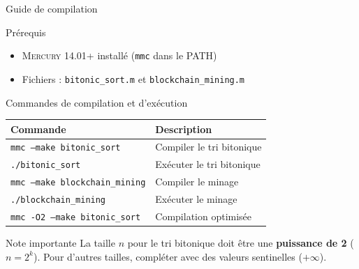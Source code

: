 \documentclass[aspectratio=169,12pt]{beamer}
\newcommand{\mercury}{\textsc{Mercury}}
\begin{document}
\begin{frame}{\faTerminal\quad Guide de compilation}
  \begin{block}{Prérequis}
    \begin{itemize}
      \item \mercury{} 14.01+ installé (\texttt{mmc} dans le PATH)
      \item Fichiers : \texttt{bitonic\_sort.m} et
            \texttt{blockchain\_mining.m}
    \end{itemize}
  \end{block}

  \vspace{0.4em}
  \begin{exampleblock}{Commandes de compilation et d'exécution}
    \begin{tabular}{ll}
      \toprule
      \textbf{Commande} & \textbf{Description} \\
      \midrule
      \texttt{mmc --make bitonic\_sort} &
        Compiler le tri bitonique \\
      \texttt{./bitonic\_sort} &
        Exécuter le tri bitonique \\
      \texttt{mmc --make blockchain\_mining} &
        Compiler le minage \\
      \texttt{./blockchain\_mining} &
        Exécuter le minage \\
      \texttt{mmc -O2 --make bitonic\_sort} &
        Compilation optimisée \\
      \bottomrule
    \end{tabular}
  \end{exampleblock}

  \vspace{0.3em}
  \begin{alertblock}{Note importante}
    La taille $n$ pour le tri bitonique doit être une
    \textbf{puissance de 2} ($n = 2^k$). Pour d'autres tailles,
    compléter avec des valeurs sentinelles ($+\infty$).
  \end{alertblock}
\end{frame}
\end{document}
